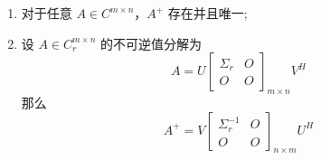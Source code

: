             \begin{enumerate}
                \item 对于任意 $A \in C^{m \times n}$，$A^{+}$ 存在并且唯一;
                \item 设 $A \in C_r^{m \times n}$ 的不可逆值分解为 
                    \begin{equation*}
                        A = U \begin{bmatrix}
                            \varSigma_r & O \\ O & O 
                        \end{bmatrix}_{m \times n} V^H
                    \end{equation*}
                    那么 
                    \begin{equation*}
                        A^{+} = V \begin{bmatrix}
                            \varSigma_r^{-1} & O \\ O & O
                        \end{bmatrix}_{n \times m} U^H
                    \end{equation*}
            \end{enumerate}

